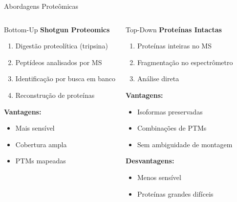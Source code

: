 \begin{frame}[shrink=5]{Abordagens Proteômicas}
\begin{columns}
\begin{block}{Bottom-Up}
\textbf{Shotgun Proteomics}
\begin{enumerate}
    \item Digestão proteolítica (tripsina)
    \item Peptídeos analisados por MS
    \item Identificação por busca em banco
    \item Reconstrução de proteínas
\end{enumerate}

\textbf{Vantagens:}
\begin{itemize}
    \item Mais sensível
    \item Cobertura ampla
    \item PTMs mapeadas
\end{itemize}
\end{block}

\begin{block}{Top-Down}
\textbf{Proteínas Intactas}
\begin{enumerate}
    \item Proteínas inteiras no MS
    \item Fragmentação no espectrômetro
    \item Análise direta
\end{enumerate}

\textbf{Vantagens:}
\begin{itemize}
    \item Isoformas preservadas
    \item Combinações de PTMs
    \item Sem ambiguidade de montagem
\end{itemize}

\textbf{Desvantagens:}
\begin{itemize}
    \item Menos sensível
    \item Proteínas grandes difíceis
\end{itemize}
\end{block}
\end{columns}
\end{frame}

